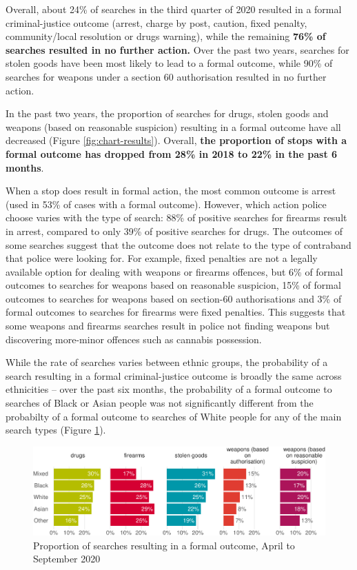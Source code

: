 \documentclass[
  a4paper,
  twoside, 11pt]{article}
\begin{document}
Overall, about 24\% of searches in the third quarter of 2020 resulted in a formal criminal-justice outcome (arrest, charge by post, caution, fixed penalty, community/local resolution or drugs warning), while the remaining \textbf{76\% of searches resulted in no further action.} Over the past two years, searches for stolen goods have been most likely to lead to a formal outcome, while 90\% of searches for weapons under a section 60 authorisation resulted in no further action.

In the past two years, the proportion of searches for drugs, stolen goods and weapons (based on reasonable suspicion) resulting in a formal outcome have all decreased (Figure \ref{fig:chart-results}). Overall, \textbf{the proportion of stops with a formal outcome has dropped from 28\% in 2018 to 22\% in the past 6 months}.

When a stop does result in formal action, the most common outcome is arrest (used in 53\% of cases with a formal outcome). However, which action police choose varies with the type of search: 88\% of positive searches for firearms result in arrest, compared to only 39\% of positive searches for drugs. The outcomes of some searches suggest that the outcome does not relate to the type of contraband that police were looking for. For example, fixed penalties are not a legally available option for dealing with weapons or firearms offences, but 6\% of formal outcomes to searches for weapons based on reasonable suspicion, 15\% of formal outcomes to searches for weapons based on section-60 authorisations and 3\% of formal outcomes to searches for firearms were fixed penalties. This suggests that some weapons and firearms searches result in police not finding weapons but discovering more-minor offences such as cannabis possession.

While the rate of searches varies between ethnic groups, the probability of a search resulting in a formal criminal-justice outcome is broadly the same across ethnicities -- over the past six months, the probability of a formal outcome to searches of Black or Asian people was not significantly different from the probabilty of a formal outcome to searches of White people for any of the main search types (Figure \ref{fig:chart-outcomes-ethnicity}).



\begin{figure}[tb]

{\centering \includegraphics{2020-Q3_files/figure-latex/chart-outcomes-ethnicity-1} 

}

\caption{Proportion of searches resulting in a formal outcome, April to September 2020}\label{fig:chart-outcomes-ethnicity}
\end{figure}
\end{document}

